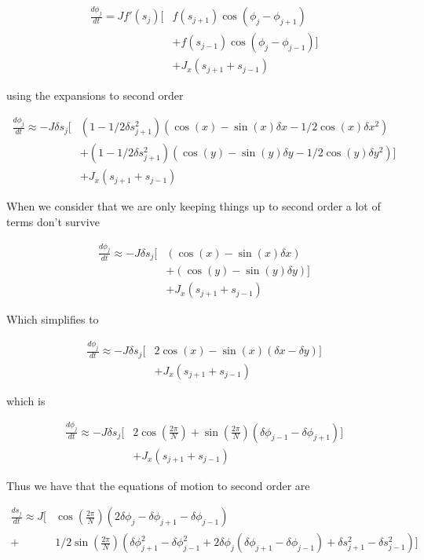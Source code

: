 \documentclass{article}
\begin{document}
\begin{align*}
    \frac{d\phi_j}{dt} = Jf'(s_j)[&f(s_{j+1})\cos(\phi_j - \phi_{j+1}) \\
                                  &+f(s_{j-1})\cos(\phi_j - \phi_{j-1})] \\
                                  &+J_x(s_{j+1} + s_{j-1})
\end{align*}

using the expansions to second order

\begin{align*}
    \frac{d\phi_j}{dt} \approx -J\delta s_j[&(1-1/2\delta s_{j+1}^2)(\cos(x) - \sin(x)\delta x - 1/2 \cos(x)\delta x^2) \\
                                  &+(1-1/2\delta s_{j+1}^2)(\cos(y) - \sin(y)\delta y - 1/2 \cos(y)\delta y^2)] \\
                                  &+J_x(s_{j+1} + s_{j-1})
\end{align*}


When we consider that we are only keeping things up to second order a lot of terms don't survive

\begin{align*}
    \frac{d\phi_j}{dt} \approx -J\delta s_j[&(\cos(x) - \sin(x)\delta x) \\
                                  &+(\cos(y) - \sin(y)\delta y)] \\
                                  &+J_x(s_{j+1} + s_{j-1})
\end{align*}

Which simplifies to 

\begin{align*}
    \frac{d\phi_j}{dt} \approx -J\delta s_j[&2\cos(x) - \sin(x)(\delta x - \delta y)] \\
                                  &+J_x(s_{j+1} + s_{j-1})
\end{align*}

which is

\begin{align*}
    \frac{d\phi_j}{dt} \approx -J\delta s_j[&2\cos(\frac{2\pi}{N}) + \sin(\frac{2\pi}{N})(\delta\phi_{j-1} - \delta\phi_{j+1})] \\
                                  &+J_x(s_{j+1} + s_{j-1})
\end{align*}

\space

Thus we have that the equations of motion to second order are

\begin{align*}
    \frac{ds_j}{dt} \approx J[&\cos(\frac{2\pi}{N})(2\delta\phi_{j} - \delta\phi_{j+1} - \delta\phi_{j-1}) \\
                                +&1/2\sin(\frac{2\pi}{N})(\delta\phi_{j+1}^2 - \delta\phi_{j-1}^2 + 2\delta\phi_{j}(\delta\phi_{j+1} - \delta\phi_{j-1}) + \delta s_{j+1}^2 - \delta s_{j-1}^2)]
\end{align*}
\end{document}
